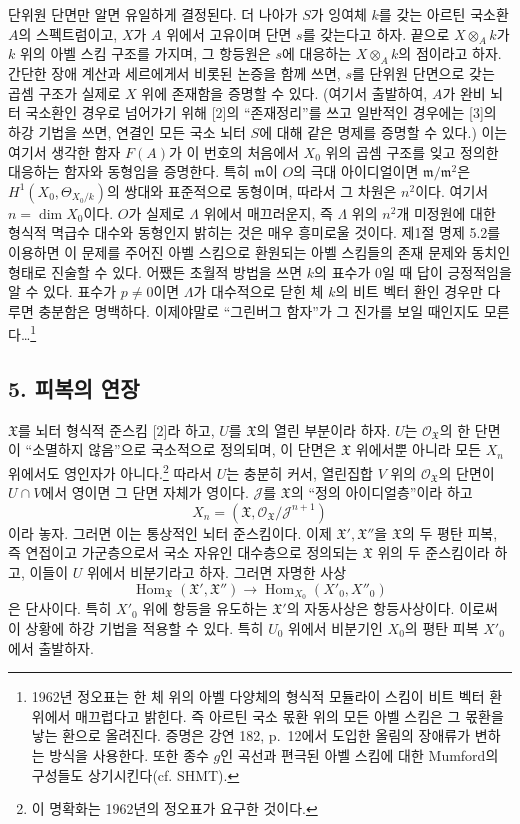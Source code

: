 \documentclass[11pt,twoside,openany]{book}
\numberwithin{equation}{section}
\newcommand{\sourceunit}{front}
\newcommand{\src}[1]{%
  \phantomsection\hypertarget{src:\sourceunit:#1}{}%
  \marginpar{\raggedleft\footnotesize\sffamily #1}%
}
\theoremstyle{plain}
\theoremstyle{definition}
\theoremstyle{remark}
\begin{document}
\src{387}
단위원 단면만 알면 유일하게 결정된다. 더 나아가 $S$가 잉여체 $k$를 갖는
아르틴 국소환 $A$의 스펙트럼이고, $X$가 $A$ 위에서 고유이며 단면 $s$를
갖는다고 하자. 끝으로 $X\otimes_Ak$가 $k$ 위의 아벨 스킴 구조를 가지며,
그 항등원은 $s$에 대응하는 $X\otimes_Ak$의 점이라고 하자. 간단한 장애
계산과 세르에게서 비롯된 논증을 함께 쓰면, $s$를 단위원 단면으로 갖는
곱셈 구조가 실제로 $X$ 위에 존재함을 증명할 수 있다. (여기서 출발하여,
$A$가 완비 뇌터 국소환인 경우로 넘어가기 위해 [2]의 ``존재정리''를 쓰고
일반적인 경우에는 [3]의 하강 기법을 쓰면, 연결인 모든 국소 뇌터 $S$에
대해 같은 명제를 증명할 수 있다.) 이는 여기서 생각한 함자 $F(A)$가 이
번호의 처음에서 $X_0$ 위의 곱셈 구조를 잊고 정의한 대응하는 함자와
동형임을 증명한다. 특히 $\mathfrak m$이 $O$의 극대 아이디얼이면
$\mathfrak m/\mathfrak m^2$은 $H^1(X_0,\Theta_{X_0/k})$의 쌍대와
표준적으로 동형이며, 따라서 그 차원은 $n^2$이다. 여기서
$n=\dim X_0$이다. $O$가 실제로 $\Lambda$ 위에서 매끄러운지, 즉
$\Lambda$ 위의 $n^2$개 미정원에 대한 형식적 멱급수 대수와 동형인지
밝히는 것은 매우 흥미로울 것이다. 제1절 명제 5.2를 이용하면 이 문제를
주어진 아벨 스킴으로 환원되는 아벨 스킴들의 존재 문제와 동치인 형태로
진술할 수 있다. 어쨌든 초월적 방법을 쓰면 $k$의 표수가 0일 때 답이
긍정적임을 알 수 있다. 표수가 $p\ne0$이면 $\Lambda$가 대수적으로 닫힌
체 $k$의 비트 벡터 환인 경우만 다루면 충분함은 명백하다. 이제야말로
``그린버그 함자''가 그 진가를 보일 때인지도 모른다\ldots\footnote{1962년
정오표는 한 체 위의 아벨 다양체의 형식적 모듈라이 스킴이 비트 벡터 환 위에서
매끄럽다고 밝힌다. 즉 아르틴 국소 몫환 위의 모든 아벨 스킴은 그 몫환을
낳는 환으로 올려진다. 증명은 강연 182, p.~12에서 도입한 올림의 장애류가
변하는 방식을 사용한다. 또한 종수 $g$인 곡선과 편극된 아벨 스킴에 대한
Mumford의 구성들도 상기시킨다(cf. SHMT).}
\subsection*{5. 피복의 연장}

$\mathfrak X$를 뇌터 형식적 준스킴 [2]라 하고, $U$를 $\mathfrak X$의
열린 부분이라 하자. $U$는 $\mathcal O_{\mathfrak X}$의 한 단면이
``소멸하지 않음''으로 국소적으로 정의되며, 이 단면은 $\mathfrak X$ 위에서뿐
아니라 모든 $X_n$ 위에서도 영인자가 아니다.\footnote{이 명확화는 1962년의
정오표가 요구한 것이다.} 따라서 $U$는 충분히 커서, 열린집합 $V$ 위의
$\mathcal O_{\mathfrak X}$의 단면이 $U\cap V$에서 영이면 그 단면 자체가
영이다. $\mathcal J$를 $\mathfrak X$의 ``정의 아이디얼층''이라 하고
\[
  X_n=(\mathfrak X,\mathcal O_{\mathfrak X}/\mathcal J^{n+1})
\]
이라 놓자. 그러면 이는 통상적인 뇌터 준스킴이다. 이제
$\mathfrak X',\mathfrak X''$을 $\mathfrak X$의 두 평탄 피복, 즉 연접이고
가군층으로서 국소 자유인 대수층으로 정의되는 $\mathfrak X$ 위의 두
준스킴이라 하고, 이들이 $U$ 위에서 비분기라고 하자. 그러면 자명한 사상
\[
  \operatorname{Hom}_{\mathfrak X}(\mathfrak X',\mathfrak X'')
  \longrightarrow
  \operatorname{Hom}_{X_0}(X'_0,X''_0)
\]
은 단사이다. 특히 $X'_0$ 위에 항등을 유도하는 $\mathfrak X'$의
자동사상은 항등사상이다. 이로써 이 상황에 하강 기법을 적용할 수 있다.
특히 $U_0$ 위에서 비분기인 $X_0$의 평탄 피복 $X'_0$에서 출발하자.
\end{document}
